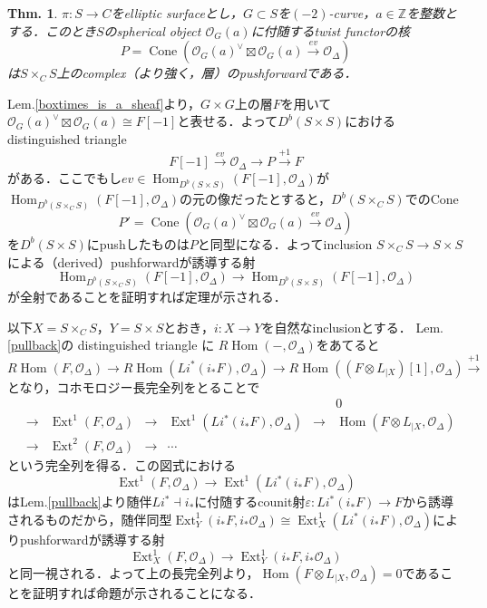 \documentclass[uplatex,a4paper,11pt,dvipdfmx]{jsarticle}
\makeatletter
\theoremstyle{mystyle} %
\newtheorem{theorem}{Thm.}[section]
\renewenvironment{proof}[1][\proofname]{\par
 \pushQED{\qed}%
 \normalfont \topsep6\p@\@plus6\p@\relax
 \trivlist
 \item[\hskip\labelsep
 \itshape
 {\bf\underline{#1}}]\ignorespaces
}{%
 \popQED\endtrivlist\@endpefalse
}
\DeclareMathOperator{\Hom}{Hom}
\DeclareMathOperator{\Ext}{Ext}
\DeclareMathOperator{\Cone}{Cone}
\makeatother
\begin{document}
\begin{theorem}
	$\pi \colon S \to C$をelliptic surfaceとし，$G \subset S$を$(-2)$-curve，$a \in \mathbb{Z}$を整数とする．このとき$S$のspherical object $\mathcal{O}_G(a)$に付随するtwist functorの核$$P = \Cone(\mathcal{O}_G(a)^\vee \boxtimes \mathcal{O}_G(a) \xrightarrow{ev} \mathcal{O}_\Delta)$$は$S\times_C S$上のcomplex（より強く，層）のpushforwardである．
\end{theorem}
\begin{proof}
	Lem.\ref{boxtimes_is_a_sheaf}より，$G\times G$上の層$F$を用いて$\mathcal{O}_G(a)^\vee \boxtimes \mathcal{O}_G(a)\cong F[-1]$と表せる．よって$D^b(S \times S)$におけるdistinguished triangle$$F[-1] \xrightarrow{ev} \mathcal{O}_\Delta \to P \xrightarrow{+1} F$$がある．ここでもし$ev \in \Hom_{D^b(S\times S)}(F[-1], \mathcal{O}_\Delta)$が$\Hom_{D^b(S\times_C S)}(F[-1], \mathcal{O}_\Delta)$の元の像だったとすると，$D^b(S\times_C S)$でのCone$$P' = \Cone(\mathcal{O}_G(a)^\vee \boxtimes \mathcal{O}_G(a) \xrightarrow{ev} \mathcal{O}_\Delta)$$を$D^b(S\times S)$にpushしたものは$P$と同型になる．よってinclusion $S\times_C S \to S\times S$による（derived）pushforwardが誘導する射$$\Hom_{D^b(S\times_C S)}(F[-1], \mathcal{O}_\Delta) \to \Hom_{D^b(S\times S)}(F[-1], \mathcal{O}_\Delta)$$が全射であることを証明すれば定理が示される．

	以下$X=S\times_C S$，$ Y=S\times S$とおき，$i \colon X \to Y$を自然なinclusionとする．
	Lem.\ref{pullback}の distinguished triangle に $R\Hom(-, \mathcal{O}_\Delta)$をあてると
	$$R\Hom(F, \mathcal{O}_\Delta) \to R\Hom(Li^*(i_*F), \mathcal{O}_\Delta) \to R\Hom((F\otimes L_{|X})[1], \mathcal{O}_\Delta) \xrightarrow{+1}$$
	となり，コホモロジー長完全列をとることで
	\[
		\begin{array}{ccccccc}
			 &     &                               &     &                                        &     & 0                                         \\
			 & \to & \Ext^1(F, \mathcal{O}_\Delta) & \to & \Ext^1(Li^*(i_*F), \mathcal{O}_\Delta) & \to & \Hom(F\otimes L_{|X}, \mathcal{O}_\Delta) \\
			 & \to & \Ext^2(F, \mathcal{O}_\Delta) & \to & \cdots                                 &     &
		\end{array}
	\]
	という完全列を得る．この図式における$$\Ext^1(F, \mathcal{O}_\Delta) \to \Ext^1(Li^*(i_*F), \mathcal{O}_\Delta)$$はLem.\ref{pullback}より随伴$Li^* \dashv i_*$に付随するcounit射$\varepsilon \colon Li^*(i_*F) \to F$から誘導されるものだから，随伴同型$\Ext_Y^1(i_*F, i_*\mathcal{O}_\Delta) \cong \Ext_X^1(Li^*(i_*F), \mathcal{O}_\Delta)$によりpushforwardが誘導する射$$\Ext_X^1(F, \mathcal{O}_\Delta) \to \Ext_Y^1(i_*F, i_*\mathcal{O}_\Delta)$$と同一視される．よって上の長完全列より，$\Hom(F\otimes L_{|X}, \mathcal{O}_\Delta) =0$であることを証明すれば命題が示されることになる．


\end{proof}
\end{document}
